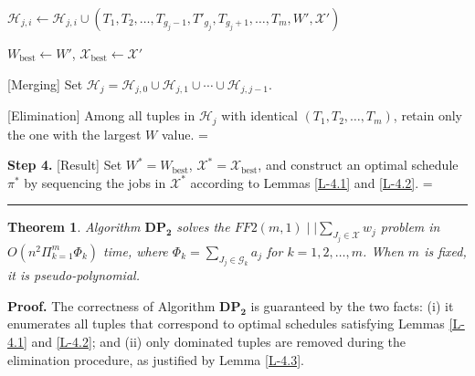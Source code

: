 \documentclass[12pt, eqno, limlimits]{article}
\newtheorem{theorem}{Theorem}[section]
\begin{document}
\begin{sloppypar}
\begin{algorithm}[tbp]
{{{{{                                $\mathcal{H}_{j,i} \leftarrow \mathcal{H}_{j,i} \cup (T_1, T_2, \ldots, T_{g_j-1}, T'_{g_j}, T_{g_j+1}, \ldots, T_m, W', \mathcal{X}')$ \;
                                
                                {$W_{\text{best}} \gets W'$, $\mathcal{X}_{\text{best}} \gets \mathcal{X}'$ \;}
                            }	
                        }
                    }
                    
                    [Merging] Set $\mathcal{H}_{j}=\mathcal{H}_{j,0} \cup \mathcal{H}_{j,1} \cup \cdots \cup \mathcal{H}_{j,j-1}$. \;
                    
                    [Elimination] Among all tuples in $\mathcal{H}_j$ with identical $(T_1, T_2, \dots, T_m)$,  retain only the one with the largest $W$ value. \hspace*{\algorithmicindent}%
                    \hangindent=\dimexpr{}\relax%
                }
            } 
            
            \textbf{Step 4.} [Result] Set $W^{*}=W_{\text{best}}$, $\mathcal{X}^*=\mathcal{X}_{\text{best}}$, and construct an optimal schedule $\pi^{*}$ by sequencing the jobs in $\mathcal{X}^*$ according to Lemmas \ref{L-4.1} and \ref{L-4.2}. \hspace*{\algorithmicindent}%
            \hangindent=\dimexpr{}\relax%
            
            \vspace{0.1cm}
            \hrule 
        \end{algorithm} 
        
        \begin{theorem} \label{T-4.3}
            Algorithm $\mathbf{DP_2}$ solves the $FF2(m, 1)\mid \mid \sum_{J_j \in \mathcal{X}} w_j$ problem in $O(n^2 \Pi_{k=1}^m \Phi_k)$ time, where $\Phi_k=\sum_{J_j \in \mathcal{G}_k} a_j$ for $k=1, 2, \ldots, m$. When $m$ is fixed, it is pseudo-polynomial.
        \end{theorem}
        
        \noindent \textbf{Proof.} The correctness of Algorithm $\mathbf{DP_2}$ is guaranteed by the two facts: (i) it enumerates all tuples that correspond to optimal schedules satisfying Lemmas \ref{L-4.1} and \ref{L-4.2}; and (ii) only dominated tuples are removed during the elimination procedure, as justified by Lemma \ref{L-4.3}.
        

\end{sloppypar}
\end{document}
